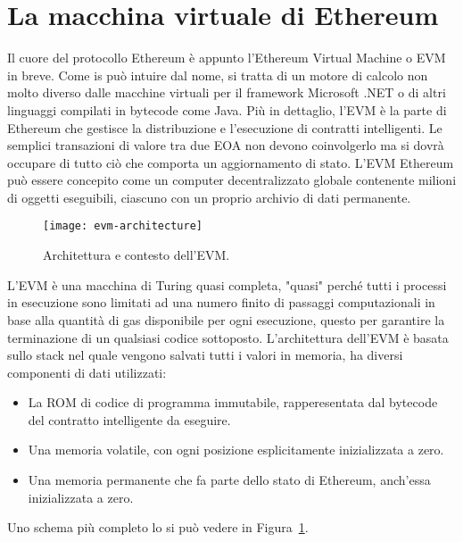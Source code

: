 \section{La macchina virtuale di Ethereum}
Il cuore del protocollo Ethereum è appunto l'Ethereum Virtual Machine o EVM in breve. Come is può intuire dal nome, si tratta di un motore di calcolo non molto diverso dalle macchine virtuali per il framework Microsoft .NET o di altri linguaggi compilati in bytecode come Java. Più in dettaglio, l'EVM è la parte di Ethereum che gestisce la distribuzione e l'esecuzione di contratti intelligenti. Le semplici transazioni di valore tra due EOA non devono coinvolgerlo ma si dovrà occupare di tutto ciò che comporta un aggiornamento di stato. L'EVM Ethereum può essere concepito come un computer decentralizzato globale contenente milioni di oggetti eseguibili, ciascuno con un proprio archivio di dati permanente. 
%
\begin{figure}
	\centering 
	\texttt{[image: evm-architecture]} 
	\caption[Architettura dell'EVM]{Architettura e contesto dell'EVM.}
	\label{fig:evm-architecture} 
\end{figure}
%
L'EVM è una macchina di Turing quasi completa, "quasi" perché tutti i processi in esecuzione sono limitati ad una numero finito di passaggi computazionali in base alla quantità di gas disponibile per ogni esecuzione, questo per garantire la terminazione di un qualsiasi codice sottoposto. L'architettura dell'EVM è basata sullo stack nel quale vengono salvati tutti i valori in memoria, ha diversi componenti di dati utilizzati:
\begin{itemize}
	\item La ROM di codice di programma immutabile, rapperesentata dal bytecode del contratto intelligente da eseguire.
	\item Una memoria volatile, con ogni posizione esplicitamente inizializzata a zero.
	\item Una memoria permanente che fa parte dello stato di Ethereum, anch'essa inizializzata a zero.
\end{itemize}
Uno schema più completo lo si può vedere in Figura~\ref{fig:evm-architecture}.

